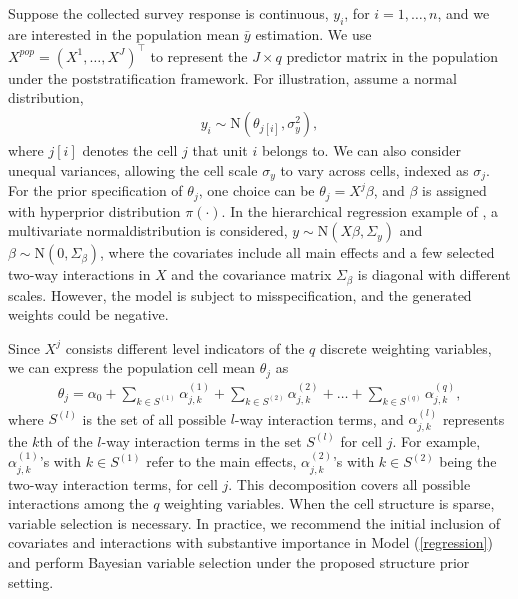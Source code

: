 \documentclass[11pt]{article}
\begin{document}
Suppose the collected survey response is continuous, $y_i$, for $i=1,\dots, n$, and we are interested in the population mean $\bar{y}$ estimation. We use $X^{pop}=(X^1,\dots, X^J)^\top$ to represent the $J\times q$ predictor matrix in the population under the poststratification framework. For illustration, assume a normal distribution,
\begin{align}
\label{normal}
	y_i \sim \textrm{N}(\theta_{j[i]}, \sigma_y^2),
\end{align}
where $j[i]$ denotes the cell $j$ that unit $i$ belongs to. We can also consider unequal variances, allowing the cell scale $\sigma_y$ to vary across cells, indexed as $\sigma_j$. For the prior specification of $\theta_j$, one choice can be  $\theta_j=X^j\beta$, and $\beta$ is assigned with hyperprior distribution $\pi(\cdot)$. In the hierarchical regression example of \cite{gelman07}, a multivariate normaldistribution is considered, $y\sim \textrm{N}(X\beta, \Sigma_{y})$ and $\beta \sim \textrm{N}(0,\Sigma_{\beta})$, where the covariates include all main effects and a few selected two-way interactions in $X$ and the covariance matrix $\Sigma_{\beta}$ is diagonal with different scales. However, the model is subject to misspecification, and the generated weights could be negative.
	
Since $X^j$ consists different level indicators of the $q$ discrete weighting variables, we can express the population cell mean $\theta_j$ as
\begin{align}
\label{regression}
	\theta_j=\alpha_0 + \sum_{k\in S^{(1)}}\alpha_{j,k}^{(1)}+\sum_{k\in S^{(2)}}\alpha_{j,k}^{(2)}+\dots+\sum_{k\in S^{(q)}}\alpha_{j,k}^{(q)},
\end{align}
where $S^{(l)}$ is the set of all possible $l$-way interaction terms, and $\alpha^{(l)}_{j,k}$ represents the $k$th of the $l$-way interaction terms in the set $S^{(l)}$ for cell $j$. For example, $\alpha^{(1)}_{j,k}$'s with $k\in S^{(1)}$ refer to the main effects, $\alpha^{(2)}_{j,k}$'s with $k\in S^{(2)}$ being the two-way interaction terms, for cell $j$. This decomposition covers all possible interactions among the $q$ weighting variables. When the cell structure is sparse, variable selection is necessary. In practice, we recommend the initial inclusion of covariates and interactions with substantive importance in Model (\ref{regression}) and perform Bayesian variable selection under the proposed structure prior setting.
\end{document}
